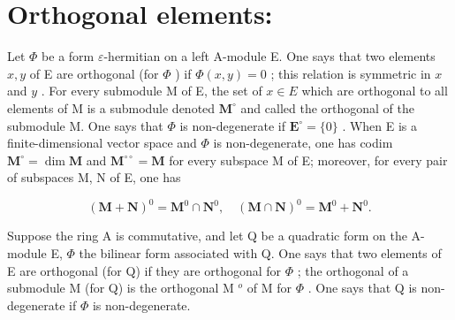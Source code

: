 \section*{Orthogonal elements:}

Let \(\Phi\) be a form \(\varepsilon\)-hermitian on a left A-module E. One says that two elements \(x, y\) of E are orthogonal (for \(\Phi\) ) if \(\Phi(x, y) = 0\) ; this relation is symmetric in \(x\) and \(y\) . For every submodule M of E, the set of \(x \in E\) which are orthogonal to all elements of M is a submodule denoted \(\mathbf{M}^{\circ}\) and called the orthogonal of the submodule M. One says that \(\Phi\) is non-degenerate if \(\mathbf{E}^{\circ} = \{0\}\) . When E is a finite-dimensional vector space and \(\Phi\) is non-degenerate, one has codim \(\mathbf{M}^{\circ} = \dim \mathbf{M}\) and \(\mathbf{M}^{\circ\circ} = \mathbf{M}\) for every subspace M of E; moreover, for every pair of subspaces M, N of E, one has

\[
(\mathbf {M} + \mathbf {N}) ^ {0} = \mathbf {M} ^ {0} \cap \mathbf {N} ^ {0}, \quad (\mathbf {M} \cap \mathbf {N}) ^ {0} = \mathbf {M} ^ {0} + \mathbf {N} ^ {0}.
\]

Suppose the ring A is commutative, and let Q be a quadratic form on the A-module E, \(\Phi\) the bilinear form associated with Q. One says that two elements of E are orthogonal (for Q) if they are orthogonal for \(\Phi\) ; the orthogonal of a submodule M (for Q) is the orthogonal M \(^{o}\) of M for \(\Phi\) . One says that Q is non-degenerate if \(\Phi\) is non-degenerate.

